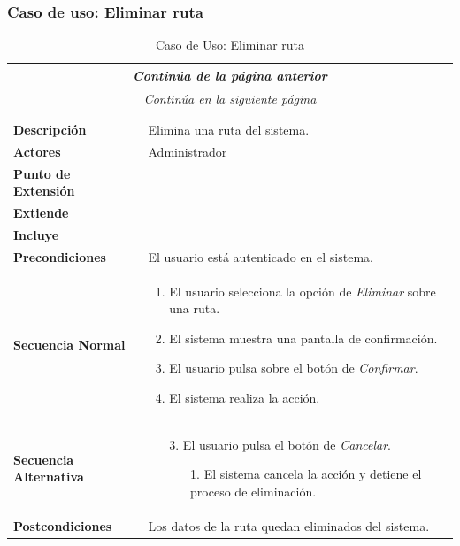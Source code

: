 \subsubsection*{Caso de uso: Eliminar ruta }
\begin{longtable}{| p{4cm} | p{10cm} |}
\endfirsthead
\multicolumn{2}{c}{\textit{Continúa de la página anterior}}\\[12pt]
\hline
\endhead
\hline
\multicolumn{2}{c}{\textit{Continúa en la siguiente página}} \\
\endfoot
\hline
\caption{Caso de Uso: Eliminar ruta}\label{fig:1}\\
\endlastfoot


\hline
\multicolumn{2}{|c|}{\textbf{CU$<$30$>$ - Eliminar Ruta}} \\

\hline
\textbf{Descripción} &
Elimina una ruta del sistema.\\

\hline
\textbf{Actores} &
Administrador\\

\hline
\textbf{Punto de Extensión} &
\\

\hline
\textbf{Extiende} &
\\

\hline
\textbf{Incluye} &
\\

\hline
\textbf{Precondiciones} &
El usuario está autenticado en el sistema.\\

\hline
\textbf{Secuencia Normal} &\mbox{}\par\vspace{-\baselineskip}
\begin{enumerate}[leftmargin=0.7cm, topsep=0.1cm]
\item El usuario selecciona la opción de \textit{Eliminar} sobre una ruta.
\item El sistema muestra una pantalla de confirmación.
\item El usuario pulsa sobre el botón de \textit{Confirmar}.
\item El sistema realiza la acción.
\end{enumerate}


\\
\hline
\textbf{Secuencia Alternativa} &\mbox{}\par\vspace{-\baselineskip}
\begin{enumerate}[leftmargin=0.9cm, topsep=0.1cm]
\item[3.] El usuario pulsa el botón de \textit{Cancelar}.
	\begin{itemize}
	\item[1.] El sistema cancela la acción y detiene el proceso de eliminación.
	\end{itemize}
\end{enumerate}
\\

\hline
\textbf{Postcondiciones} & 
Los datos de la ruta quedan eliminados del sistema.\\
\hline
\end{longtable}




